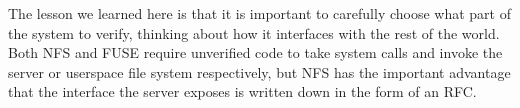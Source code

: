 The lesson we learned here is that it is important to carefully choose what part
of the system to verify, thinking about how it interfaces with the rest of the
world. Both NFS and FUSE require unverified code to take system calls and invoke
the server or userspace file system respectively, but NFS has the important
advantage that the interface the server exposes is written down in the form of
an RFC.



%


